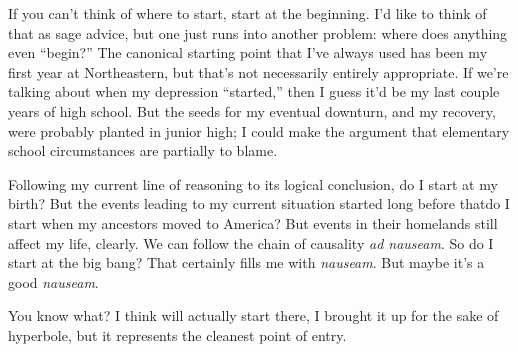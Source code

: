 \documentclass[./butidigress.tex]{subfiles}
\begin{document}
If you can't think of where to start, start at the beginning.
I'd like to think of that as sage advice, but one just runs into another problem: where does anything even \enquote{begin?}
The canonical starting point that I've always used has been my first year at Northeastern, but that's not necessarily entirely appropriate.
If we're talking about when my depression \enquote{started,} then I guess it'd be my last couple years of high school.
But the seeds for my eventual downturn, and my recovery, were probably planted in junior high; I could make the argument that elementary school circumstances are partially to blame.

Following my current line of reasoning to its logical conclusion, do I start at my birth?
But the events leading to my current situation started long before that\lips do I start when my ancestors moved to America?
But events in their homelands still affect my life, clearly.
We can follow the chain of causality \textit{ad nauseam}.
So do I start at the big bang?
That certainly fills me with \textit{nauseam}.
But maybe it's a good \textit{nauseam}.

You know what?
I think will actually start there, I brought it up for the sake of hyperbole, but it represents the cleanest point of entry.


\end{document}
